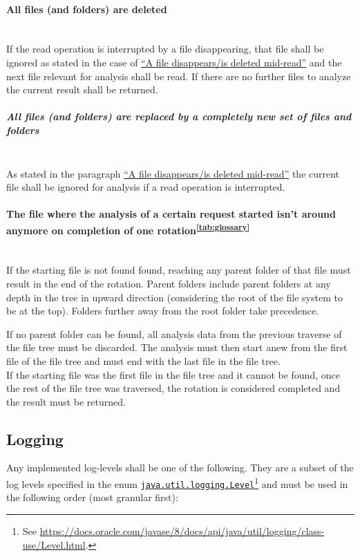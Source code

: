 \documentclass[11pt]{article} %
\begin{document}
    \paragraph{All files (and folders) are deleted}\label{par:everything_deleted} ~\\
    If the read operation is interrupted by a file disappearing, that file shall be ignored as stated in the case of \hyperref[par:file_disappear]{``A file disappears/is deleted mid-read''} and the next file relevant for analysis shall be read. If there are no further files to analyze the current result shall be returned.

    \subparagraph{All files (and folders) are replaced by a completely new set of files and folders} ~\\
    As stated in the paragraph \hyperref[par:file_disappear]{``A file disappears/is deleted mid-read''} the current file shall be ignored for analysis if a read operation is interrupted.

    \paragraph{The file where the analysis of a certain request started isn't around anymore on completion of one rotation\textsuperscript{\ref{tab:glossary}}} ~\\
    If the starting file is not found found, reaching any parent folder of that file must result in the end of the rotation. Parent folders include parent folders at any depth in the tree in upward direction (considering the root of the file system to be at the top). Folders further away from the root folder take precedence.

    If no parent folder can be found, all analysis data from the previous traverse of the file tree must be discarded. The analysis must then start anew from the first file of the file tree and must end with the last file in the file tree.\\
    If the starting file was the first file in the file tree and it cannot be found, once the rest of the file tree was traversed, the rotation is considered completed and the result must be returned.

    \subsection{Logging}\label{sec:3.3}

    Any implemented log-levels shall be one of the following. They are a subset of the log levels specified in the enum \href{https://docs.oracle.com/javase/8/docs/api/java/util/logging/class-use/Level.html}{\texttt{java.util.logging.Level}}\footnote{See \url{https://docs.oracle.com/javase/8/docs/api/java/util/logging/class-use/Level.html}.} and must be used in the following order (most granular first):
\end{document}
